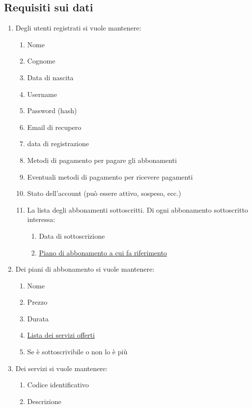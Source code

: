 
\subsection{Requisiti sui dati}
\begin{enumerate}

\item \hypertarget{AnReqUt}{Degli utenti registrati si vuole mantenere:}
	\begin{enumerate}[label*=\arabic*.]
	\item Nome
	\item Cognome
	\item Data di nascita
	\item Username
	\item Password (hash)
	\item Email di recupero
	\item data di registrazione
	\item Metodi di pagamento per pagare gli abbonamenti
	\item Eventuali metodi di pagamento per ricevere pagamenti
	\item Stato dell'account (può essere attivo, sospeso, ecc.)
	\item La lista degli abbonamenti sottoscritti. Di ogni abbonamento sottoscritto interessa:
		\begin{enumerate}[label*=\arabic*.]
		\item Data di sottoscrizione
		\item \hyperlink{AnReqPianiAbb}{Piano di abbonamento a cui fa riferimento}
		\end{enumerate}
	\end{enumerate}

\item \hypertarget{AnReqPianiAbb}{Dei piani di abbonamento si vuole mantenere:}
	\begin{enumerate}[label*=\arabic*.]
	\item Nome
	\item Prezzo
	\item Durata
	\item \hyperlink{AnReqServizi}{Lista dei servizi offerti}
	\item Se è sottoscrivibile o non lo è più
	\end{enumerate}

\item \hypertarget{AnReqServizi}{Dei servizi si vuole mantenere:}
	\begin{enumerate}[label*=\arabic*.]
	\item Codice identificativo
	\item Descrizione
	\end{enumerate}


\end{enumerate}
